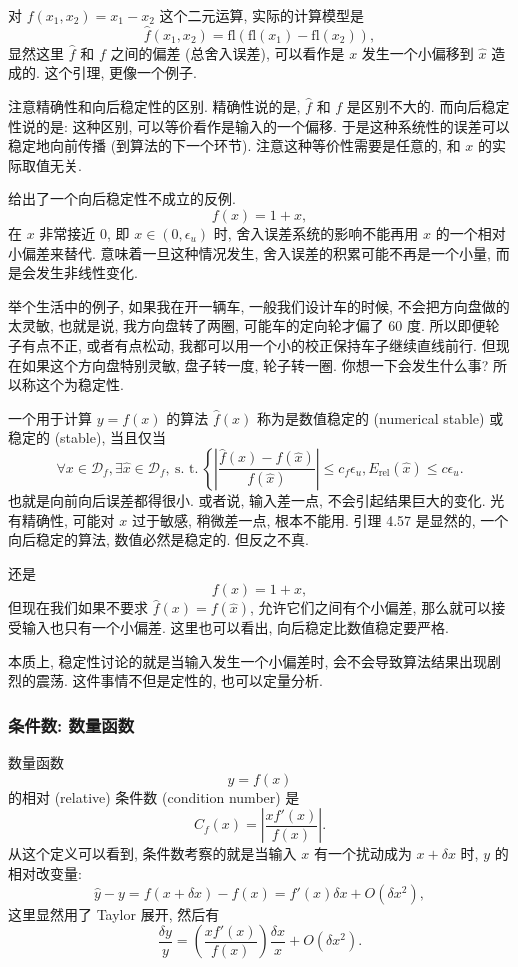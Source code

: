 \documentclass[a4paper]{ctexart}
\begin{document}
 对 $f(x_1, x_2) = x_1 - x_2$ 这个二元运算, 实际的计算模型是
$$
\hat{f}(x_1, x_2) = \mbox{fl}(\mbox{fl}(x_1) - \mbox{fl}(x_2)),
$$
显然这里 $\hat{f}$ 和 $f$ 之间的偏差 (总舍入误差), 可以看作是 $x$ 发生一个小偏移到
$\hat{x}$ 造成的. 这个引理, 更像一个例子.

注意精确性和向后稳定性的区别. 精确性说的是, $\hat{f}$ 和 $f$ 是区别不大的.
而向后稳定性说的是: 这种区别, 可以等价看作是输入的一个偏移.
于是这种系统性的误差可以稳定地向前传播 (到算法的下一个环节).
注意这种等价性需要是任意的, 和 $x$ 的实际取值无关.

 给出了一个向后稳定性不成立的反例.
$$
f(x) = 1 + x,
$$
在 $x$ 非常接近 $0$, 即 $x \in (0, \epsilon_u)$ 时, 舍入误差系统的影响不能再用
$x$ 的一个相对小偏差来替代. 意味着一旦这种情况发生, 舍入误差的积累可能不再是一个小量,
而是会发生非线性变化.

举个生活中的例子, 如果我在开一辆车, 一般我们设计车的时候, 不会把方向盘做的太灵敏,
也就是说, 我方向盘转了两圈, 可能车的定向轮才偏了 60 度. 所以即便轮子有点不正,
或者有点松动, 我都可以用一个小的校正保持车子继续直线前行. 但现在如果这个方向盘特别灵敏,
盘子转一度, 轮子转一圈. 你想一下会发生什么事? 所以称这个为稳定性.

 一个用于计算 $y = f(x)$ 的算法 $\hat{f}(x)$
称为是数值稳定的 (numerical stable) 或稳定的 (stable), 当且仅当
$$
\forall x \in \mathscr{D}_f, \exists \hat{x} \in \mathscr{D}_f,
~\mbox{s. t.}~ \left\{
\left|\frac{\hat{f}(x) - f(\hat{x})}{f(\hat{x})}\right| \leq c_f \epsilon_u,
E_{\mbox{rel}}(\hat{x}) \leq c \epsilon_u.
\right.
$$
也就是向前向后误差都得很小. 或者说, 输入差一点, 不会引起结果巨大的变化. 光有精确性,
可能对 $x$ 过于敏感, 稍微差一点, 根本不能用. 引理 4.57 是显然的, 一个向后稳定的算法,
数值必然是稳定的. 但反之不真.

 还是
$$
f(x) = 1 + x,
$$
但现在我们如果不要求 $\hat{f}(x) = f(\hat{x})$, 允许它们之间有个小偏差,
那么就可以接受输入也只有一个小偏差. 这里也可以看出, 向后稳定比数值稳定要严格.

本质上, 稳定性讨论的就是当输入发生一个小偏差时, 会不会导致算法结果出现剧烈的震荡.
这件事情不但是定性的, 也可以定量分析.

\subsubsection{条件数: 数量函数}

 数量函数
$$
y = f(x)
$$
的相对 (relative) 条件数 (condition number) 是
$$
C_f(x) = \left|\frac{x f'(x)}{f(x)}\right|.
$$
从这个定义可以看到, 条件数考察的就是当输入 $x$ 有一个扰动成为 $x + \delta x$ 时,
$y$ 的相对改变量:
$$
\hat{y} - y = f(x + \delta x) - f(x) = f'(x)\delta x + O(\delta x^2),
$$
这里显然用了 Taylor 展开, 然后有
$$
\frac{\delta y}{y} = \left(\frac{x f'(x)}{f(x)}\right)\frac{\delta x}{x}
+ O(\delta x^2).
$$
\end{document}
